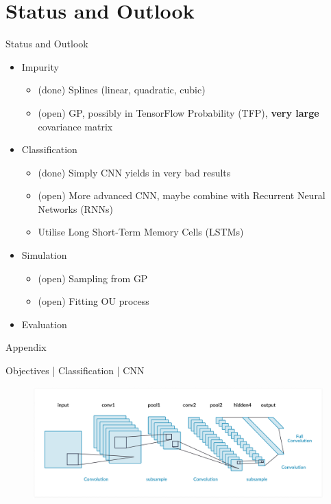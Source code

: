 \documentclass{beamer}
\begin{document}
    
    \section{Status and Outlook}
    \begin{frame}{Status and Outlook}
        \begin{itemize}
            \item Impurity
                \begin{itemize}
                    \item (done) Splines (linear, quadratic, cubic)
                    \item (open) GP, possibly in TensorFlow Probability (TFP), \textbf{very large} covariance matrix
                \end{itemize}
            \item Classification
                \begin{itemize}
                    \item (done) Simply CNN yields in very bad results
                    \item (open) More advanced CNN, maybe combine with Recurrent Neural Networks (RNNs)
                    \item Utilise Long Short-Term Memory Cells (LSTMs)
                \end{itemize}
            \item Simulation
                \begin{itemize}
                    \item (open) Sampling from GP
                    \item (open) Fitting OU process
                \end{itemize}
            \item Evaluation
        \end{itemize}
    \end{frame}
    
    \appendix
    
    \begin{frame}[standout]{}
        \center Appendix
    \end{frame}
    
    \begin{frame}{Objectives | Classification | CNN}
        \begin{figure}[hbt]
        	\center
        	\includegraphics[width=1.0\textwidth]{img/cnn_example.png}
        	\label{fig:cnn_example}
        \end{figure}
    \end{frame}
    
\end{document}
